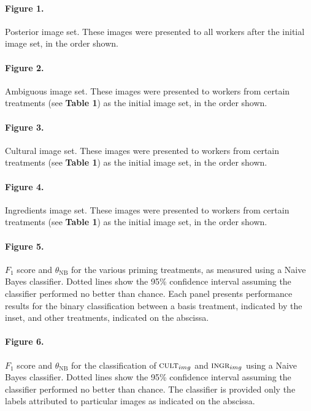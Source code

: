 \documentclass[a4paper]{report}
\begin{document}
\paragraph{Figure 1.}
	Posterior image set. These images were presented to all workers after the 
	initial image set, in the order shown. 

\paragraph{Figure 2.}
	Ambiguous image set. These images were presented to workers from certain
	treatments (see \textbf{Table 1}) as the initial image set, in the order 
	shown.  

\paragraph{Figure 3.}
	Cultural image set. These images were presented to workers from 
	certain treatments (see \textbf{Table 1}) as the initial image set, in the 
	order shown.  

\paragraph{Figure 4.}
	Ingredients image set. These images were presented to workers from 
	certain treatments (see \textbf{Table 1}) as the initial image set, in the 
	order shown.  

\paragraph{Figure 5.}
$F_1$ score and $\theta_\text{NB}$ for the various 
priming treatments, as measured using a Naive Bayes classifier. Dotted lines 
show the 95\% confidence interval
assuming the classifier performed no better than chance.  Each panel 
presents performance results for the binary classification between a basis 
treatment, indicated by the inset, and other treatments, indicated on the 
abscissa.

\paragraph{Figure 6.}
$F_1$ score and $\theta_\text{NB}$ for the classification of 
$\textsc{cult}_{img}$ and $\textsc{ingr}_{img}$ using a Naive Bayes 
classifier.  Dotted lines 
show the 95\% confidence interval
assuming the classifier performed no better than chance.  The classifier is provided only the labels attributed to
particular images as indicated on the abscissa.
\end{document}
